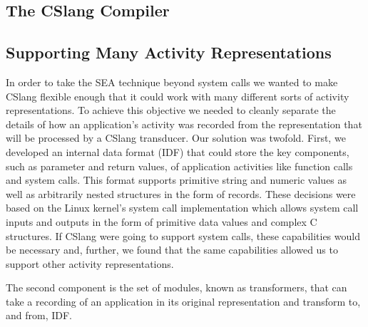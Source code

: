 \subsection{The CSlang Compiler}


\subsection{Supporting Many Activity Representations}

In order to take the SEA technique beyond system calls we wanted to make
CSlang flexible enough that it could work with many different sorts of
activity representations.
To achieve this objective we needed to cleanly separate the details of how
an application's activity was recorded from the representation that will be
processed by a CSlang transducer.
Our solution was twofold.  First, we developed an internal data format
(IDF) that
could store the key components, such as parameter and return values,
of application activities like function
calls and system calls.  This format supports primitive string and numeric
values as well as arbitrarily nested structures in the form of records.
These decisions were based on the Linux kernel's system call implementation
which allows system call inputs and outputs in the form of primitive data
values and complex C structures.
If CSlang were going to support system calls, these capabilities would be
necessary and, further, we found that the same capabilities allowed us to
support other activity representations.

The second component is the set of modules, known as transformers, that can
take a recording of an application in its original representation and
transform to, and from, IDF.


